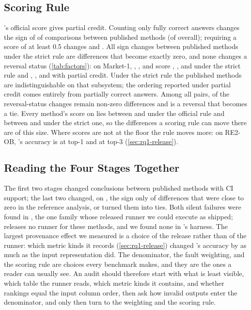\subsection{Scoring Rule}
\label{sec:rq2-scoring}

\openrca's official score gives partial credit.
Counting only fully correct answers changes the sign of \ScStrictPubSign of \ScStrictPubComp comparisons between published methods (\ScStrictAllSign of \ScStrictAllComp overall); requiring a score of at least 0.5 changes \ScHalfPubSign and \ScHalfAllSign.
All \ScStrictPubToZero sign changes between published methods under the strict rule are differences that become exactly zero, and none changes a reversal status (\cref{tab:factors}): on Market-1, \baro, \rcd, and \ediag score \ScMktOneBaroStrict, \ScMktOneRcdStrict, and \ScMktOneEdiagStrict under the strict rule and \ScMktOneBaroPartial, \ScMktOneRcdPartial, and \ScMktOneEdiagPartial with partial credit.
Under the strict rule the published methods are indistinguishable on that subsystem; the ordering reported under partial credit comes entirely from partially correct answers.
Among all pairs, \ScStrictAllRevNonzero of the reversal-status changes remain non-zero differences and \ScStrictAllRevToZero is a reversal that becomes a tie.
Every method's score on \openrca lies between \ScOpenrcaOfficialMin and \ScOpenrcaOfficialMax under the official rule and between \ScOpenrcaStrictMin and \ScOpenrcaStrictMax under the strict one, so the differences a scoring rule can move there are of this size.
Where scores are not at the floor the rule moves more: on RE2-OB, \baro's accuracy is \BaroAccReTwoOB at top-1 and \BaroReTwoOBAccThree at top-3 (\cref{sec:rq1-release}).

\subsection{Reading the Four Stages Together}
\label{sec:rq2-summary}

The first two stages changed conclusions between published methods with CI support; the last two changed, on \openrca, the sign only of differences that were close to zero in the reference analysis, or turned them into ties.
Both silent failures were found in \rcaeval, the one family whose released runner we could execute as shipped; \openrca releases no runner for these methods, and we found none in \petshop's harness.
The largest provenance effect we measured is a choice of the release rather than of the runner: which metric kinds it records (\cref{sec:rq1-release}) changed \baro's accuracy by as much as the input representation did.
The denominator, the fault weighting, and the scoring rule are choices every benchmark makes, and they are the ones a reader can usually see.
An audit should therefore start with what is least visible, which table the runner reads, which metric kinds it contains, and whether rankings equal the input column order, then ask how invalid outputs enter the denominator, and only then turn to the weighting and the scoring rule.
